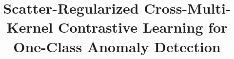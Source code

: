 \documentclass[times, review, 10pt]{elsarticle}
\begin{document}
\begin{frontmatter}


\title{Scatter-Regularized Cross-Multi-Kernel Contrastive
Learning for One-Class Anomaly Detection}


\author{} %


\begin{abstract}






\end{abstract}
\end{frontmatter}
\end{document}
